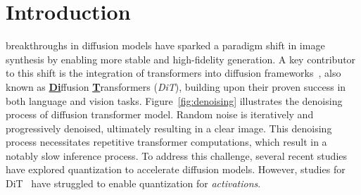 \IEEEpubidadjcol
\vspace{-0.5cm}
\section{Introduction}
\vspace{-0.1cm}
%
 breakthroughs in diffusion models have sparked a paradigm shift in image synthesis by enabling more stable and high-fidelity generation. 
%
A key contributor to this shift is the integration of transformers into diffusion frameworks~\cite{sd3, pixart-sigma, flux}, also known as \underline{\textbf{Di}}ffusion \underline{\textbf{T}}ransformers (\emph{DiT}), building upon their proven success in both language and vision tasks.
% 
Figure~\ref{fig:denoising} illustrates the denoising process of diffusion transformer model.
%
Random noise is iteratively and progressively denoised, ultimately resulting in a clear image. 
%
This denoising process necessitates repetitive transformer computations, which result in a notably slow inference process.
% 
To address this challenge, several recent studies~\cite{ptq4dit, qdit, viditq, flightvgm, mixdq, paro} have explored quantization to accelerate diffusion models.
%
However, studies for DiT~\cite{ptq4dit, qdit, viditq} have struggled to enable quantization for \emph{activations}.

